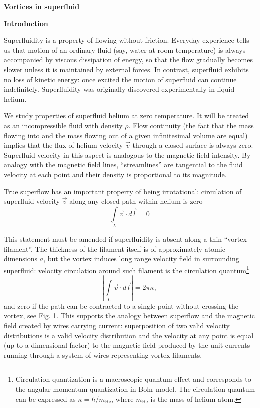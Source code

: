 {\large\textbf{Vortices in superfluid}}

\textbf{Introduction}

Superfluidity is a property of flowing without friction. Everyday experience
tells us that motion of an ordinary fluid (say, water at room temperature) is
always accompanied by viscous dissipation of energy, so that the flow gradually
becomes slower unless it is maintained by external forces. In contrast,
superfluid exhibits no loss of kinetic energy: once excited the motion of
superfluid can continue indefinitely. Superfluidity was originally discovered
experimentally in liquid helium.

We study properties of superfluid helium at zero temperature. It will be
treated as an incompressible fluid with density $\rho$. Flow continuity (the
fact that the mass flowing into and the mass flowing out of a given
infinitesimal volume are equal) implies that the flux of helium velocity
$\vec{v}$ through a closed surface is always zero. Superfluid velocity in this
aspect is analogous to the magnetic field intensity. By analogy with the
magnetic field lines, ``streamlines'' are tangential to the fluid velocity at
each point and their density is proportional to its magnitude.

True superflow has an important property of being irrotational: circulation of
superfluid velocity $\vec{v}$ along any closed path within helium is zero
\begin{equation}
\int\limits_L \vec{v} \cdot d\vec{l} = 0
\tag{1}
\end{equation}

This statement must be amended if superfluidity is absent along a thin
``vortex filament''. The thickness of the filament itself is of approximately
atomic dimensions $a$, but the vortex induces long range velocity field in
surrounding superfluid: velocity circulation around such filament is the
circulation quantum\footnote{Circulation quantization is a macroscopic quantum
effect and corresponds to the angular momentum quantization in Bohr model. The
circulation quantum can be expressed as $\kappa = \hbar/m_{\mathrm{He}}$, where
$m_{\mathrm{He}}$ is the mass of helium atom.}
\begin{equation}
\left| \int\limits_L \vec{v} \cdot d\vec{l} \right| = 2\pi\kappa,
\tag{2}
\end{equation}
and zero if the path can be contracted to a single point without crossing the
vortex, see Fig. 1. This supports the analogy between superflow and the
magnetic field created by wires carrying current: superposition of two valid
velocity distributions is a valid velocity distribution and the velocity at any
point is equal (up to a dimensional factor) to the magnetic field produced by
the unit currents running through a system of wires representing vortex
filaments.

